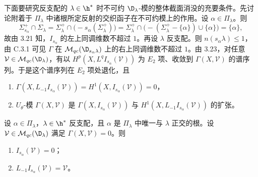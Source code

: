 下面要研究反支配的 $\lambda\in\h^*$ 时不可约 $\D_\lambda$-模的整体截面消没的充要条件。先讨论附着于 $\Pi_\lambda$ 中诸根所定反射的交织函子在不可约模上的作用。设 $\alpha\in\Pi_\lambda$。则
$$\Sigma^+_{s_\alpha}\cap\Sigma_\lambda=\Sigma^+_\lambda\cap\bigl(-s_\alpha(\Sigma^+_\lambda)\bigr)=\Sigma^+_\lambda\cap\bigl(-(\Sigma^+_\lambda-\{\alpha\})\cup\{\alpha\}\bigr)=\{\alpha\},$$
故由 3.21 知，$I_{s_\alpha}$ 的左上同调维数不超过 $1$。再设 $\lambda$ 反支配。则 $n(s_\alpha\lambda)\le 1$，由 C.3.1 可见 $\Gamma$ 在 $\mathcal{M}_{qc}(\D_{s_\alpha\lambda})$ 上的右上同调维数不超过 $1$。由 3.23，对任意 $\mathcal{V}\in\mathcal{M}_{qc}(\D_\lambda)$，有以 $H^p(X,L^qI_{s_\alpha}(\mathcal{V}))$ 为 $E_2$ 项、收敛到 $\Gamma(X,\mathcal{V})$ 的谱序列。于是这个谱序列在 $E_2$ 项处退化，且
\begin{enumerate}[label=(\alph*)]
\item $\Gamma(X,L_{-1}I_{s_\alpha}(\mathcal{V}))=H^1(X,I_{s_\alpha}(\mathcal{V}))=0$，
\item $U_\theta$-模 $\Gamma(X,\mathcal{V})$ 是 $\Gamma(X,I_{s_\alpha}(\mathcal{V}))$ 与 $H^1(X,L_{-1}I_{s_\alpha}(\mathcal{V}))$ 的扩张。
\end{enumerate}

\begin{lemma}\label{lem:03.5.4}
设 $\alpha\in\Pi_\lambda$，$\lambda\in\h^*$ 反支配，且 $\alpha$ 是 $\Pi_\lambda$ 中唯一与 $\lambda$ 正交的根。设 $\mathcal{V}\in\mathcal{M}_{qc}(\D_\lambda)$ 满足 $\Gamma(X,\mathcal{V})=0$。则
\begin{enumerate}[label=(\roman*)]
\item $I_{s_\alpha}(\mathcal{V})=0$；
\item $L_{-1}I_{s_\alpha}(\mathcal{V})=\mathcal{V}$。
\end{enumerate}
\end{lemma}

